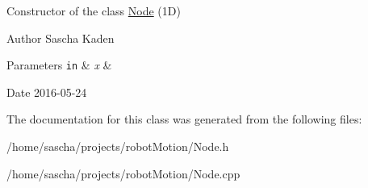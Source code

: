 Constructor of the class \hyperlink{class_node}{Node} (1\-D) 

\begin{DoxyAuthor}{Author}
Sascha Kaden 
\end{DoxyAuthor}

\begin{DoxyParams}[1]{Parameters}
\mbox{\tt in}  & {\em x} & \\
\hline
\end{DoxyParams}
\begin{DoxyDate}{Date}
2016-\/05-\/24 
\end{DoxyDate}


The documentation for this class was generated from the following files\-:\begin{DoxyCompactItemize}
\item 
/home/sascha/projects/robot\-Motion/Node.\-h\item 
/home/sascha/projects/robot\-Motion/Node.\-cpp\end{DoxyCompactItemize}

